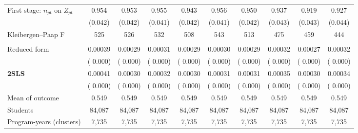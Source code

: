 \begin{tabular}{l*{9}{c}}
First stage: \(n_{pt}\) on \(Z_{pt}\) &  0.954\sym{***} &  0.953\sym{***} &  0.955\sym{***} &  0.943\sym{***} &  0.956\sym{***} &  0.950\sym{***} &  0.937\sym{***} &  0.919\sym{***} &  0.927\sym{***} \\
 & (0.042) & (0.042) & (0.041) & (0.042) & (0.041) & (0.042) & (0.043) & (0.043) & (0.044) \\
Kleibergen--Paap F &    525 &    526 &    532 &    508 &    543 &    513 &    475 &    459 &    444 \\
\addlinespace
\multicolumn{10}{l}{Graduation from any university, 8y} \\
\quad Reduced form &  0.00039\sym{***} &  0.00029\sym{**} &  0.00031\sym{**} &  0.00029\sym{**} &  0.00030\sym{**} &  0.00029\sym{**} &  0.00032\sym{**} &  0.00027\sym{**} &  0.00032\sym{**} \\
 & ( 0.000) & ( 0.000) & ( 0.000) & ( 0.000) & ( 0.000) & ( 0.000) & ( 0.000) & ( 0.000) & ( 0.000) \\
\quad \textbf{2SLS} &  0.00041\sym{***} &  0.00030\sym{**} &  0.00032\sym{**} &  0.00030\sym{**} &  0.00031\sym{**} &  0.00031\sym{**} &  0.00035\sym{**} &  0.00030\sym{**} &  0.00034\sym{**} \\
 & ( 0.000) & ( 0.000) & ( 0.000) & ( 0.000) & ( 0.000) & ( 0.000) & ( 0.000) & ( 0.000) & ( 0.000) \\
Mean of outcome & 0.549 & 0.549 & 0.549 & 0.549 & 0.549 & 0.549 & 0.549 & 0.549 & 0.549 \\
Students &    84,087 &    84,087 &    84,087 &    84,087 &    84,087 &    84,087 &    84,087 &    84,087 &    84,087 \\
Program-years (clusters) &  7,735 &  7,735 &  7,735 &  7,735 &  7,735 &  7,735 &  7,735 &  7,735 &  7,735 \\
\bottomrule
\end{tabular}
